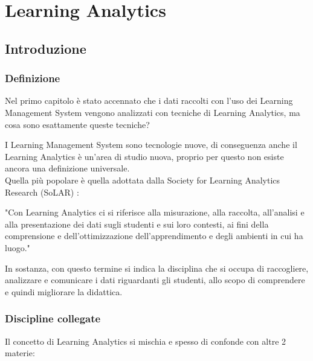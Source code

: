 \chapter{Learning Analytics}

\section{Introduzione}

\subsection{Definizione}

Nel primo capitolo è stato accennato che i dati raccolti con l'uso dei Learning Management System vengono analizzati con tecniche di Learning Analytics, ma cosa sono esattamente queste tecniche?

I Learning Management System sono tecnologie nuove, di conseguenza anche il Learning Analytics è un'area di studio nuova, proprio per questo non esiste ancora una definizione universale. \\
Quella più popolare è quella adottata dalla Society for Learning Analytics Research (SoLAR) \cite{Solaresearch} :

"Con Learning Analytics ci si riferisce alla misurazione, alla raccolta, all’analisi e alla presentazione dei dati sugli studenti e sui loro contesti, ai fini della comprensione e dell’ottimizzazione dell’apprendimento e degli ambienti in cui ha luogo." \cite{first}

In sostanza, con questo termine si indica la disciplina che si occupa di raccogliere, analizzare e comunicare i dati riguardanti gli studenti, allo scopo di comprendere e quindi migliorare la didattica.

\clearpage

\subsection{Discipline collegate}

Il concetto di Learning Analytics si mischia e spesso di confonde con altre 2 materie:

